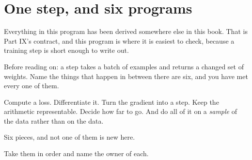 \section{One step, and six programs}
\label{sec:P33-one-step}

\begin{fr}
Everything in this program has been derived somewhere else in this book. That
is Part IX's contract, and this program is where it is easiest to check,
because a training step is short enough to write out.

Before reading on: a step takes a batch of examples and returns a changed set
of weights. Name the things that happen in between \dash{} there are six, and
you have met every one of them.
\dotline
\nextframe
\end{fr}

\begin{fr}
\begin{ansblock}
Compute a loss. Differentiate it. Turn the gradient into a step. Keep the
arithmetic representable. Decide how far to go. And do all of it on a
\emph{sample} of the data rather than on the data.
\end{ansblock}

Six pieces, and not one of them is new here.
\end{fr}

\begin{fr}
Take them in order and name the owner of each.
\dotline
\nextframe
\end{fr}

